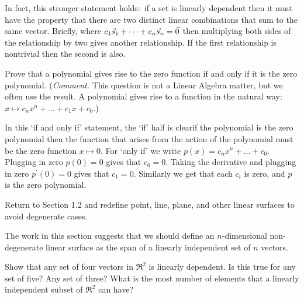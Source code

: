 \begin{exercises}
\begin{answer}
\begin{exparts}
          In fact, this stronger statement holds:~if a set is linearly 
          dependent then it must have the property that there are two 
          distinct linear combinations that sum to the same vector.
          Briefly, where \( c_1\vec{s}_1+\dots+c_n\vec{s}_n=\vec{0} \) then
          multiplying both sides of the relationship by two gives another 
          relationship.
          If the first relationship is nontrivial then the second is also.
      \end{exparts}  
    \end{answer}
  \item  \label{exer:PolyZeroFcnOnlyIfZeroPol}
     Prove that a polynomial gives rise to the zero function if and only if
     it is the zero polynomial.
     (\textit{Comment.}
     This question is not a Linear Algebra matter, but we often use the result.
     A polynomial gives rise to a function in the natural 
     way:~$x\mapsto c_nx^n+\dots+c_1x+c_0$.)
     \begin{answer}
       In this `if and only if' statement, the `if' half is clear\Dash if 
       the polynomial is the zero polynomial then the function that arises 
       from the action of the polynomial must be the zero 
       function $x\mapsto 0$. 
       For `only if' we write $p(x)=c_nx^n+\dots+c_0$. 
       Plugging in zero $p(0)=0$ gives that $c_0=0$.
       Taking the derivative and plugging in zero $p^\prime(0)=0$ gives 
       that $c_1=0$.
       Similarly we get that each $c_i$ is zero, and $p$ is the zero 
       polynomial.
     \end{answer}
  \item
    Return to Section 1.2 and redefine point, line, plane,
    and other linear surfaces to avoid degenerate cases.
    \begin{answer}
      The work in this section suggests that we should define 
      an \( n \)-dimensional
      non-degenerate linear surface as the span of a linearly
      independent set of \( n \) vectors.  
    \end{answer}
  \item 
    \begin{exparts}  
      \partsitem Show that any set of four vectors in \( \Re^2 \) is 
         linearly dependent.
      \partsitem Is this true for any set of five?
         Any set of three?
      \partsitem What is the most number of elements that a 
         linearly independent subset of $\Re^2$ can have?
    \end{exparts}
    \begin{answer}

\end{answer}
\end{exercises}
